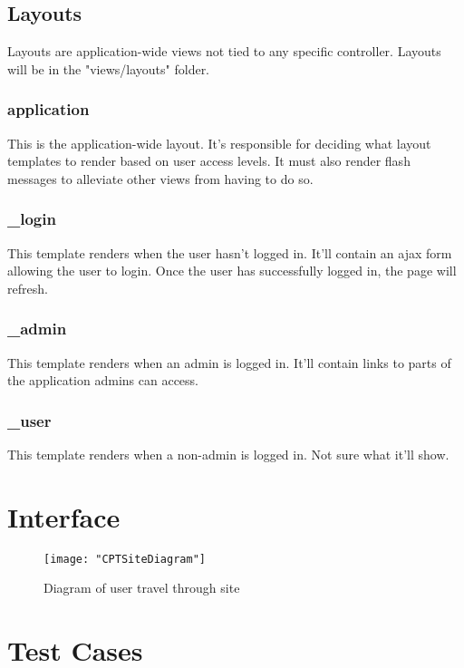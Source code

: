 \documentclass[12pt]{article}
\begin{document}
\subsection{Layouts}
Layouts are application-wide views not tied to any specific controller. Layouts will be in the "views/layouts" folder.
\subsubsection{application}
This is the application-wide layout. It's responsible for deciding what layout templates to render based on user access levels.
It must also render flash messages to alleviate other views from having to do so.
\subsubsection{\_login}
This template renders when the user hasn't logged in. It'll contain an ajax form allowing the user to login.
Once the user has successfully logged in, the page will refresh.
\subsubsection{\_admin}
This template renders when an admin is logged in. It'll contain links to parts of the application admins can access.
\subsubsection{\_user}
This template renders when a non-admin is logged in. Not sure what it'll show.


\section{Interface}\label{sec:Interface}
\begin{figure}[H]
\begin{center}
\texttt{[image: "CPTSiteDiagram"]}
\caption{Diagram of user  travel through site}
\label{fig:dia}
\end{center}
\end{figure}
\section{Test Cases}


\end{document}
